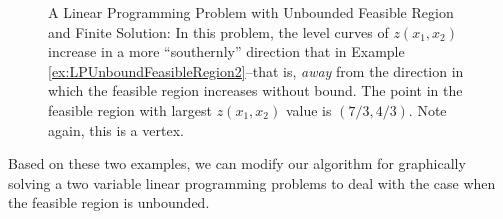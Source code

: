 \begin{solution}
\begin{figure}[H]
\begin{center}
\end{center}

\centering
\caption{A Linear Programming Problem with Unbounded Feasible Region and Finite Solution: In this problem, the level curves of $z(x_1,x_2)$ increase in a more ``southernly'' direction that in Example \ref{ex:LPUnboundFeasibleRegion2}--that is, \textit{away} from the direction in which the feasible region increases without bound. The point in the feasible region with largest $z(x_1,x_2)$ value is $(7/3,4/3)$. Note again, this is a vertex.}
\label{fig:LPUnboundFeasibleRegion2}
\end{figure}
\label{ex:LPUnboundFeasibleRegion2}
\end{solution}
Based on these two examples, we can modify our algorithm for graphically solving a two variable linear programming problems to deal with the case when the feasible region is unbounded.

